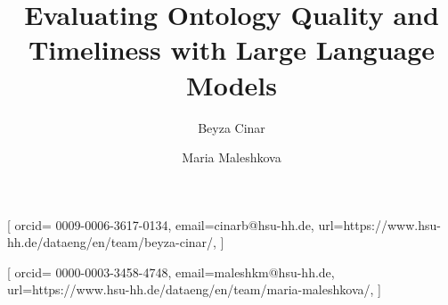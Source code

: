 \documentclass[
]{ceurart}
\begin{document}

\title{Evaluating Ontology Quality and Timeliness with Large Language Models}


\author[1]{Beyza Cinar}[%
orcid= 0009-0006-3617-0134,
email=cinarb@hsu-hh.de,
url=https://www.hsu-hh.de/dataeng/en/team/beyza-cinar/,
]
\cormark[1]
\address[1]{Professorship of Data Engineering, Helmut Schmidt University, Holstenhofweg 85, 22043 Hamburg, Germany}

\author[1]{Maria Maleshkova}[%
orcid= 0000-0003-3458-4748,
email=maleshkm@hsu-hh.de,
url=https://www.hsu-hh.de/dataeng/en/team/maria-maleshkova/,
]%

\end{document}
